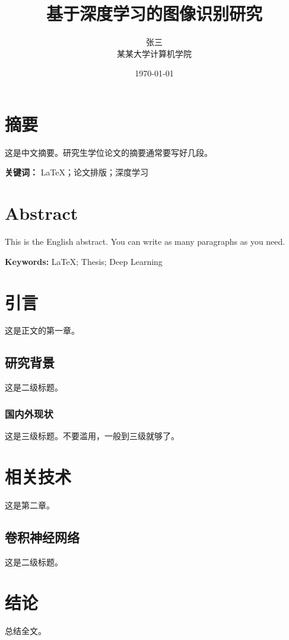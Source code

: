 \documentclass[UTF8,12pt,a4paper]{ctexart}
\begin{document}
\title{\textbf{基于深度学习的图像识别研究}}
\author{张三\\某某大学计算机学院}
\date{\today}
\maketitle
\thispagestyle{empty}       %

\newpage
{}       %

\section*{摘要}
这是中文摘要。研究生学位论文的摘要通常要写好几段。

\vspace{1em}
\noindent\textbf{关键词：} LaTeX；论文排版；深度学习

\newpage

\section*{Abstract}
This is the English abstract. You can write as many paragraphs as you need.

\vspace{1em}
\noindent\textbf{Keywords:} LaTeX; Thesis; Deep Learning

\newpage

\tableofcontents
{}
\newpage


\section{引言}
\label{sec:intro}
这是正文的第一章。

\subsection{研究背景}
这是二级标题。
\subsubsection{国内外现状}
这是三级标题。不要滥用，一般到三级就够了。

\section{相关技术}
\label{sec:related}
这是第二章。

\subsection{卷积神经网络}
这是二级标题。

\section{结论}
\label{sec:conclusion}
总结全文。
\end{document}
